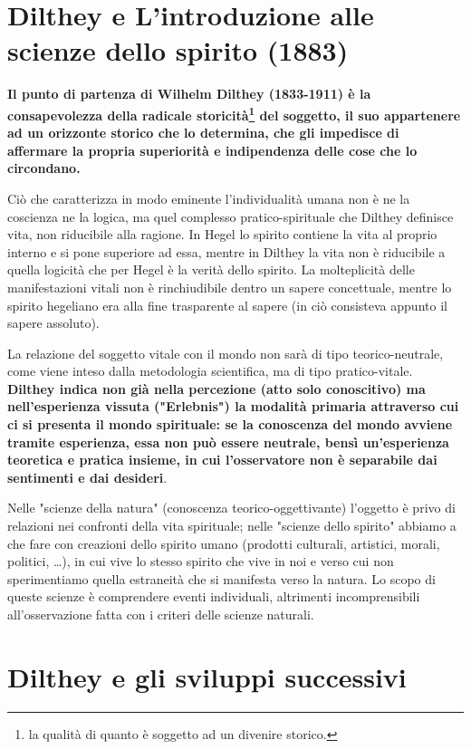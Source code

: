 \section{Dilthey e L'introduzione alle scienze dello spirito (1883)}

\textbf{Il punto di partenza di Wilhelm Dilthey (1833-1911) è la consapevolezza della radicale storicità\footnote{la qualità  di quanto è soggetto ad un divenire storico.} del soggetto, il suo appartenere ad un orizzonte storico che lo determina, che gli impedisce di affermare la propria superiorità e indipendenza delle cose che lo circondano.}

Ciò che caratterizza  in modo eminente l'individualità umana non è ne la coscienza ne la logica, ma quel complesso pratico-spirituale che Dilthey definisce vita, non riducibile alla ragione. In Hegel lo spirito contiene la vita al proprio interno e si pone superiore ad essa, mentre in Dilthey la vita non è riducibile a quella logicità che per Hegel è la verità dello spirito. La molteplicità delle manifestazioni vitali non è rinchiudibile dentro un sapere concettuale, mentre lo spirito hegeliano era alla fine trasparente al sapere (in ciò consisteva appunto il sapere assoluto).

La relazione del soggetto vitale con il mondo non sarà di tipo teorico-neutrale, come viene inteso dalla metodologia scientifica, ma di tipo pratico-vitale. \textbf{Dilthey indica non già nella percezione (atto solo conoscitivo) ma nell'esperienza vissuta ("Erlebnis") la modalità primaria attraverso cui ci si presenta il mondo spirituale: se la conoscenza del mondo avviene tramite esperienza, essa non può essere neutrale, bensì un'esperienza teoretica e pratica insieme, in cui l'osservatore non è separabile dai sentimenti e dai desideri}.

Nelle "scienze della natura" (conoscenza teorico-oggettivante) l'oggetto è privo di relazioni nei confronti della vita spirituale; nelle "scienze dello spirito" abbiamo a che fare con creazioni dello spirito umano (prodotti culturali, artistici, morali, politici, \dots), in cui vive lo stesso spirito che vive in noi e verso cui non sperimentiamo quella estraneità che si manifesta verso la natura. Lo scopo di queste scienze è comprendere eventi individuali, altrimenti incomprensibili all'osservazione fatta con i criteri delle scienze naturali.

\section{Dilthey e gli sviluppi successivi}

